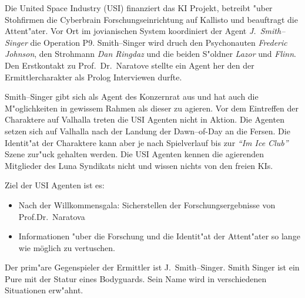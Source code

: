 \newpage
{}

Die United Space Industry (USI) finanziert das KI Projekt, betreibt "uber Stohfirmen die Cyberbrain Forschungseinrichtung auf Kallisto und beauftragt die Attent"ater. Vor Ort im jovianischen System koordiniert der Agent \emph{J.~Smith--Singer} die Operation P9. Smith--Singer wird druch den Psychonauten \emph{Frederic Johnson}, den Strohmann \emph{Dan Ringdaz} und die beiden S"oldner \emph{Lazor} und \emph{Flinn}. Den Erstkontakt zu Prof.~Dr.~Naratove stellte ein Agent her den der Ermittlercharakter als Prolog Interviewen durfte.

Smith--Singer gibt sich als Agent des Konzernrat aus und hat auch die M"oglichkeiten in gewissem Rahmen als dieser zu agieren. Vor dem Eintreffen der Charaktere auf Valhalla treten die USI Agenten nicht in Aktion. Die Agenten setzen sich auf Valhalla nach der Landung der Dawn--of-Day an die Fersen. Die Identit"at der Charaktere kann aber je nach Spielverlauf bis zur \emph{"`Im Ice Club"'} Szene zur"uck gehalten werden. Die USI Agenten kennen die agierenden Mitglieder des Luna Syndikats nicht und wissen nichts von den freien KIs.

Ziel der USI Agenten ist es:

\begin{itemize}
    \item Nach der Willkommensgala: Sicherstellen der Forschungsergebnisse von Prof.Dr.~Naratova
    \item Informationen "uber die Forschung und die Identit"at der Attent"ater so lange wie möglich zu vertuschen.    
\end{itemize}

Der prim"are Gegenspieler der Ermittler ist J.~Smith--Singer. Smith Singer ist ein Pure mit der Statur eines Bodyguards. Sein Name wird in verschiedenen Situationen erw"ahnt.
\vfill

